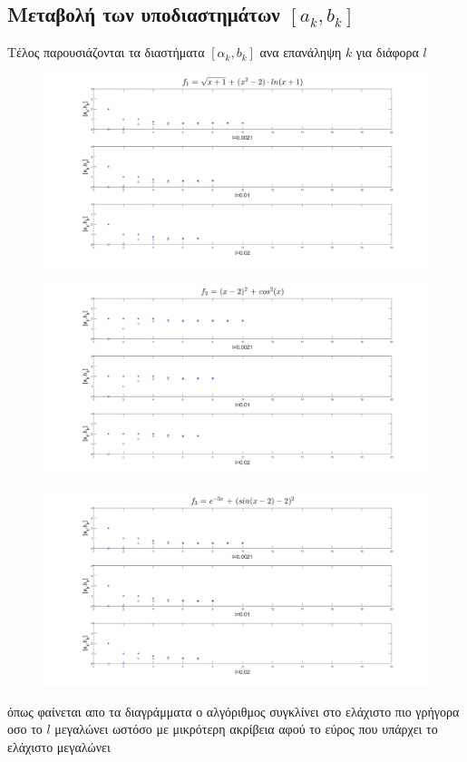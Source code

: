 \documentclass{article}
\begin{document}
  \subsection*{Μεταβολή των υποδιαστημάτων $[a_k,b_k]$}
Tέλος παρουσιάζονται τα διαστήματα $[α_k,b_k]$ ανα επανάληψη $k$ για διάφορα $l$  
\begin{figure}[h!]	
     \centering
     \advance\leftskip-2.45cm 
  \includegraphics[width=160mm,scale=2]{thema4b1.png}
\end{figure}
\begin{figure}[h!]	
     \centering
     \advance\leftskip-2.45cm 
  \includegraphics[width=160mm,scale=2]{thema4b2.png}
\end{figure} \clearpage
\begin{figure}[h!]	
     \centering
     \advance\leftskip-2.45cm 
  \includegraphics[width=170mm,scale=2]{thema4b3.png}
\end{figure}
 όπως φαίνεται απο τα διαγράμματα ο αλγόριθμος συγκλίνει στο ελάχιστο πιο γρήγορα οσο το $l$ μεγαλώνει ωστόσο με μικρότερη ακρίβεια αφού το εύρος που υπάρχει το ελάχιστο μεγαλώνει 
 \newpage
\end{document}
